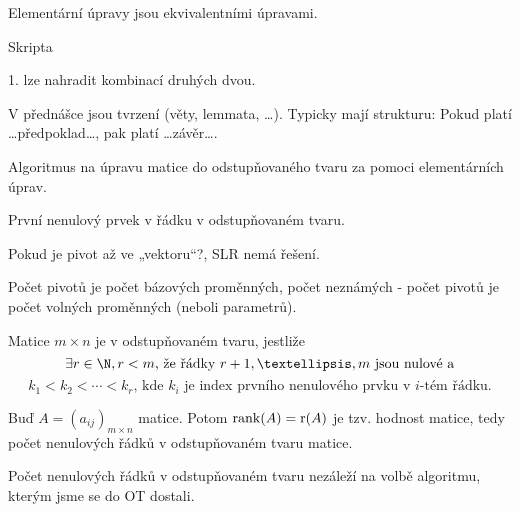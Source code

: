 \documentclass[12pt]{article}					%
\begin{document}
    \begin{tvrzeni}
        Elementární úpravy jsou ekvivalentními úpravami.
        \begin{dukazin}
            Skripta
        \end{dukazin}
        
        \begin{poznamka}
            1. lze nahradit kombinací druhých dvou.
        \end{poznamka}
    \end{tvrzeni}

    \begin{upozorneni}
        V přednášce jsou tvrzení (věty, lemmata, …). Typicky mají strukturu: Pokud platí …předpoklad…, pak platí …závěr….
    \end{upozorneni}


    \begin{definice}
        Algoritmus na úpravu matice do odstupňovaného tvaru za pomoci elementárních úprav.
    \end{definice}

    \begin{definice}[Pivot]
        První nenulový prvek v řádku v odstupňovaném tvaru.

        Pokud je pivot až ve „vektoru“?, SLR nemá řešení. 

        Počet pivotů je počet bázových proměnných, počet neznámých - počet pivotů je počet volných proměnných (neboli parametrů).
    \end{definice}

    \begin{definice}
        Matice $m\times n$ je v odstupňovaném tvaru, jestliže
        $$ \exists r \in \N, r<m\text{, že řádky }r+1,…,m\text{ jsou nulové a} $$
        $$ k_1 < k_2 < \cdots < k_r\text{, kde }k_i\text{ je index prvního nenulového prvku v }i\text{-tém řádku.} $$
    \end{definice}

    \begin{definice}
        Buď $A = (a_{ij})_{m\times n}$ matice. Potom $\operatorname{rank}(A) = \text{r}(A)$ je tzv. hodnost matice, tedy počet nenulových řádků v odstupňovaném tvaru matice.
    \end{definice}

    \begin{upozorneni}
        Počet nenulových řádků v odstupňovaném tvaru nezáleží na volbě algoritmu, kterým jsme se do OT dostali.
    \end{upozorneni}
\end{document}
